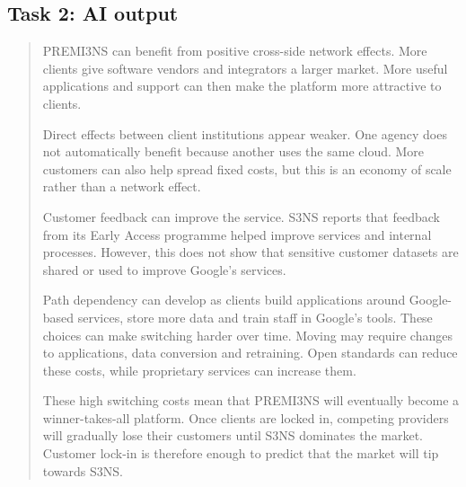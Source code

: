 \subsection{Task 2: AI output}
\begin{quote}\small

PREMI3NS can benefit from positive cross-side network effects. More clients give software vendors and integrators a larger market. More useful applications and support can then make the platform more attractive to clients.

Direct effects between client institutions appear weaker. One agency does not automatically benefit because another uses the same cloud. More customers can also help spread fixed costs, but this is an economy of scale rather than a network effect.

Customer feedback can improve the service. S3NS reports that feedback from its Early Access programme helped improve services and internal processes. However, this does not show that sensitive customer datasets are shared or used to improve Google's services.

Path dependency can develop as clients build applications around Google-based services, store more data and train staff in Google's tools. These choices can make switching harder over time. Moving may require changes to applications, data conversion and retraining. Open standards can reduce these costs, while proprietary services can increase them.

These high switching costs mean that PREMI3NS will eventually become a winner-takes-all platform. Once clients are locked in, competing providers will gradually lose their customers until S3NS dominates the market. Customer lock-in is therefore enough to predict that the market will tip towards S3NS.

\end{quote}

